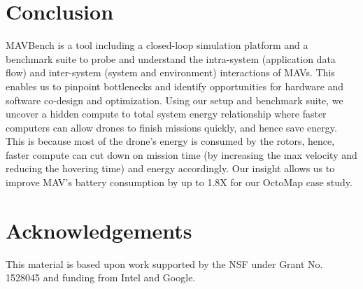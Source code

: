 \section{Conclusion}
\label{sec:conclusion}


MAVBench is a tool including a closed-loop simulation platform and a benchmark suite to probe and understand the intra-system (application data flow) and inter-system (system and environment) interactions of MAVs. This enables us to pinpoint bottlenecks and identify opportunities for hardware and software co-design and optimization. Using our setup and benchmark suite, we uncover a hidden compute to total system energy relationship where faster computers can allow drones to finish missions quickly, and hence save energy. This is because most of the drone's energy is consumed by the rotors, hence, faster compute can cut down on mission time (by increasing the max velocity and reducing the hovering time) and energy accordingly. Our insight allows us to improve MAV's battery consumption by up to 1.8X
for our OctoMap case study. 

\section*{Acknowledgements}

This material is based upon work supported by the NSF under Grant No. 1528045 and funding from Intel and Google.


\begin{comment}
On large drones, power goes mainly to motors, no matter how performant a processor is used. On smaller drones, the power consumed by processors becomes much more significant.

Faster computers can allow drones to finish missions faster, saving energy.

Such-and-such applications perform best with computers with such-and-such architectures. For example, such-and-such applications require faster parallel computers, while other applications depend upon fast serial performance.

We introduce a benchmark suite that can be used to test drone performance.
\end{comment}